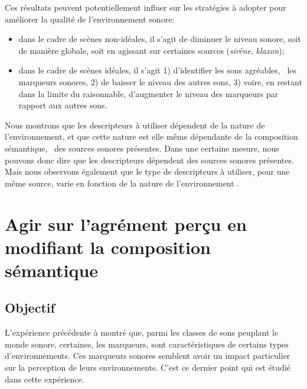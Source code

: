 Ces résultats peuvent potentiellement influer sur les stratégies à adopter pour améliorer la qualité de l’environnement sonore:

\begin{itemize}
\item dans le cadre de scènes non-idéales, il s'agit de diminuer le niveau sonore, soit de manière globale, soit en agissant sur certaines sources (\emph{sirène}, \emph{klaxon});
\item dans le cadre de scènes idéales, il s'agit 1) d'identifier les sons agréables, \ie~les marqueurs sonores, 2) de baisser le niveau des autres sons, 3) voire, en restant dans la limite du raisonnable, d'augmenter le niveau des marqueurs par rapport aux autres sons.
\end{itemize}

Nous montrons que les descripteurs à utiliser dépendent de la nature de l'environnement, et que cette nature est elle même dépendante de la composition sémantique, \ie~des sources sonores présentes. Dans une certaine mesure, nous pouvons donc dire que les descripteurs dépendent des sources sonores présentes. Mais nous observons également que le type de descripteurs à utiliser, pour une même source, varie en fonction de la nature de l'environnement . \\


\section[Modification de la composition sémantique]{Agir sur l'agrément perçu en modifiant la composition sémantique}
\label{sec:xp3}

\subsection{Objectif}

L'expérience précédente à montré que, parmi les classes de sons peuplant le monde sonore, certaines, les marqueurs, sont caractéristiques de certains types d'environnements. Ces marqueurs sonores semblent avoir un impact particulier sur la perception de leurs environnements. C'est ce dernier point qui est étudié dans cette expérience.

